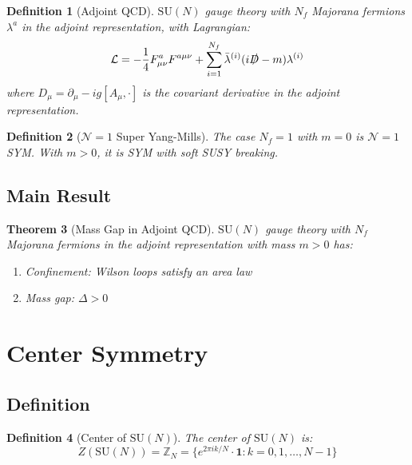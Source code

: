 \documentclass[12pt,a4paper]{article}
\newtheorem{theorem}{Theorem}[section]
\newtheorem{definition}[theorem]{Definition}
\theoremstyle{remark}
\newcommand{\SU}{\mathrm{SU}}
\newcommand{\Z}{\mathbb{Z}}
\newcommand{\N}{\mathcal{N}}
\begin{document}
\begin{definition}[Adjoint QCD]
$\SU(N)$ gauge theory with $N_f$ Majorana fermions $\lambda^a$ in the adjoint 
representation, with Lagrangian:
\begin{equation}
\mathcal{L} = -\frac{1}{4}F_{\mu\nu}^a F^{a\mu\nu} + \sum_{i=1}^{N_f} \bar{\lambda}^{(i)} (i\slashed{D} - m)\lambda^{(i)}
\end{equation}
where $D_\mu = \partial_\mu - ig[A_\mu, \cdot]$ is the covariant derivative in the 
adjoint representation.
\end{definition}

\begin{definition}[$\N=1$ Super Yang-Mills]
The case $N_f = 1$ with $m = 0$ is $\N=1$ SYM. With $m > 0$, it is SYM with soft 
SUSY breaking.
\end{definition}

\subsection{Main Result}

\begin{tcolorbox}[colback=green!5!white,colframe=green!65!black,title=\textbf{Main Theorem}]
\begin{theorem}[Mass Gap in Adjoint QCD]
\label{thm:main}
$\SU(N)$ gauge theory with $N_f$ Majorana fermions in the adjoint representation 
with mass $m > 0$ has:
\begin{enumerate}
\item[(i)] Confinement: Wilson loops satisfy an area law
\item[(ii)] Mass gap: $\Delta > 0$
\end{enumerate}
\end{theorem}
\end{tcolorbox}

\section{Center Symmetry}

\subsection{Definition}

\begin{definition}[Center of $\SU(N)$]
The center of $\SU(N)$ is:
\[
Z(\SU(N)) = \Z_N = \{e^{2\pi i k/N} \cdot \mathbf{1} : k = 0, 1, \ldots, N-1\}
\]
\end{definition}
\end{document}
